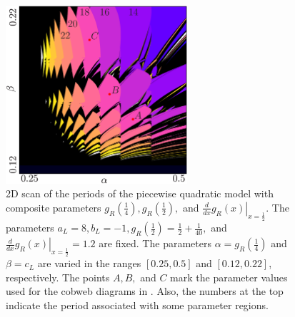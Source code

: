 \begin{figure}
	\centering
	\includegraphics[width=0.6\textwidth]{../Figures/5/5.9/result.png}
	\caption[2D scan of the periods of the quadratic model with composite parameters]{
	2D scan of the periods of the piecewise quadratic model with composite parameters $g_R\left(\frac{1}{4}\right), g_R\left(\frac{1}{2}\right),$ and $\left. \frac{d}{dx} g_R\left(x\right) \right|_{x = \frac{1}{2}}$.
	The parameters $a_L = 8, b_L = -1, g_R\left(\frac{1}{2}\right) = \frac{1}{2} + \frac{1}{40},$ and $\left. \frac{d}{dx} g_R\left(x\right) \right|_{x = \frac{1}{2}} = 1.2$ are fixed.
	The parameters $\alpha = g_R\left(\frac{1}{4}\right)$ and $\beta = c_L$ are varied in the ranges $[0.25, 0.5]$ and $[0.12, 0.22]$, respectively.
	The points $A, B,$ and $C$ mark the parameter values used for the cobweb diagrams in .
	Also, the numbers at the top indicate the period associated with some parameter regions.
	}
	\label{fig:setup.quad.hyper.1.period}
\end{figure}

